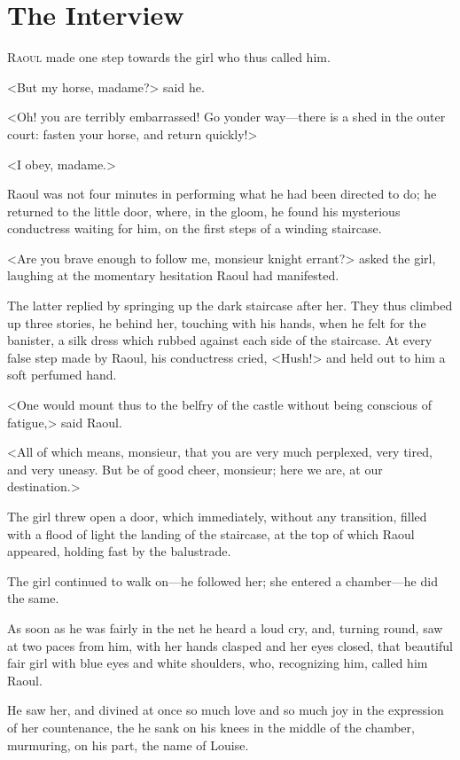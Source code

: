 \chapter{The Interview}

\lettrine{R}{aoul} made one step towards the girl who thus called him.

\zz
<But my horse, madame?> said he.

\zz
<Oh! you are terribly embarrassed! Go yonder way—there is a shed in the outer court: fasten your horse, and return quickly!>

\zz
<I obey, madame.>

Raoul was not four minutes in performing what he had been directed to do; he returned to the little door, where, in the gloom, he found his mysterious conductress waiting for him, on the first steps of a winding staircase.

<Are you brave enough to follow me, monsieur knight errant?> asked the girl, laughing at the momentary hesitation Raoul had manifested.

The latter replied by springing up the dark staircase after her. They thus climbed up three stories, he behind her, touching with his hands, when he felt for the banister, a silk dress which rubbed against each side of the staircase. At every false step made by Raoul, his conductress cried, <Hush!> and held out to him a soft perfumed hand.

<One would mount thus to the belfry of the castle without being conscious of fatigue,> said Raoul.

<All of which means, monsieur, that you are very much perplexed, very tired, and very uneasy. But be of good cheer, monsieur; here we are, at our destination.>

The girl threw open a door, which immediately, without any transition, filled with a flood of light the landing of the staircase, at the top of which Raoul appeared, holding fast by the balustrade.

The girl continued to walk on—he followed her; she entered a chamber—he did the same.

As soon as he was fairly in the net he heard a loud cry, and, turning round, saw at two paces from him, with her hands clasped and her eyes closed, that beautiful fair girl with blue eyes and white shoulders, who, recognizing him, called him Raoul.

He saw her, and divined at once so much love and so much joy in the expression of her countenance, the he sank on his knees in the middle of the chamber, murmuring, on his part, the name of Louise.

